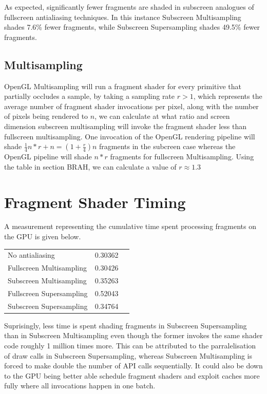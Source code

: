 \documentclass[12pt,a4paper,twoside,openright]{report}
\begin{document}
As expected, significantly fewer fragments are shaded in subscreen analogues of fullscreen antialiasing techniques. In this instance Subscreen Multisampling shades 7.6\% fewer fragments, while Subscreen Supersampling shades 49.5\% fewer fragments. 

\subsection{Multisampling}
OpenGL Multisampling will run a fragment shader for every primitive that partially occludes a sample, by taking a sampling rate $r > 1$, which represents the average number of fragment shader invocations per pixel, along with the number of pixels being rendered to $n$, we can calculate at what ratio and screen dimension subscreen multisampling will invoke the fragment shader less than fullscreen multisampling. One invocation of the OpenGL rendering pipeline will shade $\frac{1}{4}n*r + n = (1+\frac{r}{4})n$ fragments in the subcreen case whereas the OpenGL pipeline will shade $n*r$ fragments for fullscreen Multisampling. Using the table in section BRAH, we can calculate a value of $r \approx 1.3$ 

\section{Fragment Shader Timing}

A measurement representing the cumulative time spent processing fragments on the GPU is given below.

\begin{tabular}{l|c|r}
No antialiasing      & 0.30362 \\
Fullscreen Multisampling     & 0.30426 \\
Subscreen Multisampling    &  0.35263  \\
Fullscreen Supersampling      &  0.52043   \\
Subscreen Supersampling    &  0.34764  \\
\end{tabular}

Suprisingly, less time is spent shading fragments in Subscreen Supersampling than in Subscreen Multisampling even though the former invokes the same shader code roughly 1 million times more. This can be attributed to the parralelisation of draw calls in Subscreen Supersampling, whereas Subscreen Multisampling is forced to make double the number of API calls sequentially. It could also be down to the GPU being better able schedule fragment shaders and exploit caches more fully where all invocations happen in one batch.\\
\end{document}
